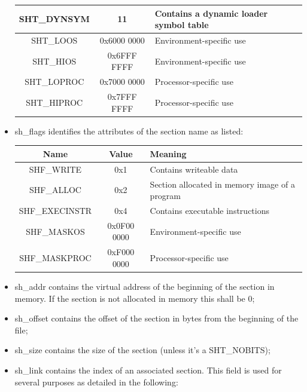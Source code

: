 \documentclass[paper=a4, fontsize=11pt]{report} %
\numberwithin{equation}{section} %
\numberwithin{figure}{section} %
\numberwithin{table}{section} %
\begin{document}
\begin{itemize}
\begin{center}
\begin{tabular}{|c|c|p{6cm}|}
			{\ttfamily SHT\_DYNSYM} & 11 & Contains a dynamic loader symbol 
			table\\ 
			\hline
			{\ttfamily SHT\_LOOS} & 0x6000 0000 & Environment-specific use\\ 
			\hline
			{\ttfamily SHT\_HIOS} & 0x6FFF FFFF & Environment-specific use \\ 
			\hline
			{\ttfamily SHT\_LOPROC} & 0x7000 0000 & Processor-specific use\\ 
			\hline
			{\ttfamily SHT\_HIPROC} & 0x7FFF FFFF & Processor-specific use\\ 
			\hline
		\end{tabular}
	\end{center}
	\item {\ttfamily sh\_flags} identifies the attributes of the section name 
	as listed:
	\begin{center}
		\begin{tabular}{|c|c|p{6cm}|}
			\hline
			\textbf{Name} & \textbf{Value} & \textbf{Meaning} \\ \hline
			{\ttfamily SHF\_WRITE} & 0x1 & Contains writeable data\\ 
			\hline
			{\ttfamily SHF\_ALLOC} & 0x2 & Section allocated in memory image of 
			a program\\ 
			\hline
			{\ttfamily SHF\_EXECINSTR} & 0x4 & Contains executable 
			instructions\\ 
			\hline
			{\ttfamily SHF\_MASKOS} & 0x0F00 0000 & Environment-specific use\\ 
			\hline
			{\ttfamily SHF\_MASKPROC} & 0xF000 0000 & Processor-specific use\\ 
			\hline
		\end{tabular}
	\end{center}
	\item {\ttfamily sh\_addr} contains the virtual address of the beginning of 
	the section in memory. If the section is not allocated in memory this shall 
	be 0;
	\item {\ttfamily sh\_offset} contains the offset of the section in bytes 
	from the beginning of the file;
	\item {\ttfamily sh\_size} contains the size of the section (unless it's a 
	{\ttfamily SHT\_NOBITS});
	\item {\ttfamily sh\_link} contains the index of an associated section. 
	This field is used for several purposes as detailed in the following:
	\begin{center}
		\begin{tabular}{|c|c|}

\end{tabular}
\end{center}
\end{itemize}
\end{document}
